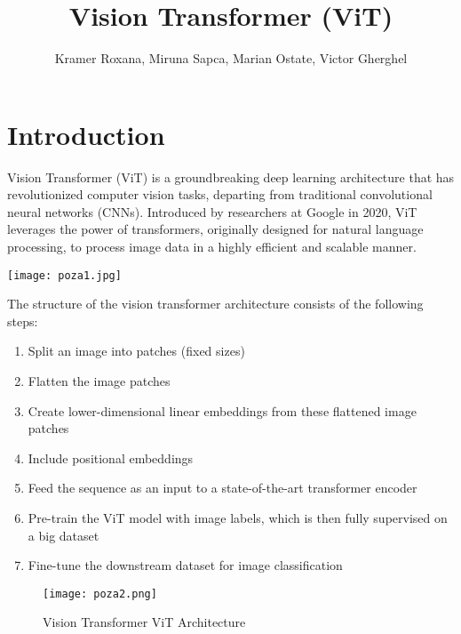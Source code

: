 \documentclass[runningheads]{llncs}
\begin{document}
\title{Vision Transformer (ViT)}
\author{Kramer Roxana, Miruna Sapca, Marian Ostate, Victor Gherghel}
\maketitle
\date{}
\begin{abstract}
    
\end{abstract}



\section{Introduction}
\small{Vision Transformer (ViT) is a groundbreaking deep learning architecture that has revolutionized computer vision tasks, departing from traditional convolutional neural networks (CNNs). Introduced by researchers at Google in 2020, ViT leverages the power of transformers, originally designed for natural language processing, to process image data in a highly efficient and scalable manner.}
\begin{center}
\texttt{[image: poza1.jpg]}
\end{center}
\newpage
The structure of the vision transformer architecture consists of the following steps: 

\begin{enumerate} 
    \item Split an image into patches (fixed sizes)
    \item Flatten the image patches
    \item Create lower-dimensional linear embeddings from these flattened image patches
    \item Include positional embeddings
    \item Feed the sequence as an input to a state-of-the-art transformer encoder
    \item Pre-train the ViT model with image labels, which is then fully supervised on a big dataset
    \item Fine-tune the downstream dataset for image classification
\end{enumerate}
\begin{center}
\begin{figure}[h]
\texttt{[image: poza2.png]}
\caption{Vision Transformer ViT Architecture}
\end{figure}
\end{center}
\end{document}
